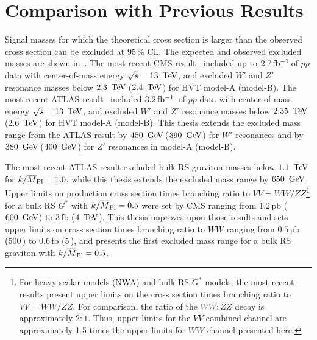 \section{Comparison with Previous Results}

Signal masses for which the theoretical cross section is larger than the observed cross section can be excluded at 95\,\% CL. The expected and observed excluded masses are shown in~\Tab{\ref{tab:excluded}}. The most recent CMS result~\cite{CMS_diboson_run2} included up to $2.7\,\mbox{fb$^{-1}$}$\,of $pp$ data with center-of-mass energy $\sqrt{s}=13\,\TeV$, and excluded $W'$ and $Z'$ resonance masses below $2.3\,\TeV$\,($2.4\,\TeV$) for HVT model-A (model-B). The most recent ATLAS result~\cite{diboson_comb_2016} included $3.2\,\mbox{fb$^{-1}$}$\, of $pp$ data with center-of-mass energy $\sqrt{s}=13\,\TeV$, and excluded $W'$ and $Z'$ resonance masses below $2.35\,\TeV$\,($2.6\,\TeV$) for HVT model-A (model-B). This thesis extends the excluded mass range from the ATLAS result by $450\,\GeV$\,($390\,\GeV$) for $W'$ resonances and by $380\,\GeV$\,($400\,\GeV$) for $Z'$ resonances in model-A (model-B).

The most recent ATLAS result excluded bulk RS graviton masses below $1.1\,\TeV$ for $k/\overline{M}_{\rm Pl}=1.0$, while this thesis extends the excluded mass range by $650\,\GeV$. Upper limits on production cross section times branching ratio to $VV=WW/ZZ$\footnote{
	 For heavy scalar models (NWA) and bulk RS $G^{*}$ models, the most recent results present upper limits on the cross section times branching ratio to $VV=WW/ZZ$. For comparison, the ratio of the $WW:ZZ$ decay is approximately $2:1$. Thus, upper limits for the $VV$ combined channel are approximately 1.5 times the upper limits for $WW$ channel presented here. 
} for a bulk RS $G^{*}$ with $k/\overline{M}_{\rm Pl}=0.5$ were set by CMS ranging from $1.2\,$pb ($600\,\GeV$) to $3\,$fb ($4\,\TeV$). This thesis improves upon those results and sets upper limits on cross section times branching ratio to $WW$ ranging from $0.5\,$pb (500\,\GeV) to $0.6\,$fb (5\,\TeV), and presents the first excluded mass range for a bulk RS graviton with $k/\overline{M}_{\rm Pl}=0.5$. 


